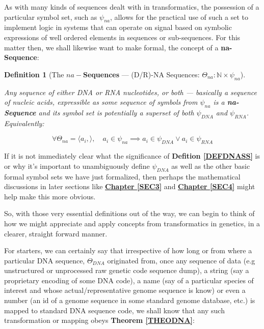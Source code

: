 \documentclass[a4paper, 18pt]{book} %
\newtheorem{defn}{Definition}
\begin{document}
As with many kinds of sequences dealt with in transformatics, the possession of a particular symbol set, such as $\psi_{na}$, allows for the practical use of such a set to implement logic in systems that can operate on signal based on symbolic expressions of well ordered elements in sequences or sub-sequences. For this matter then, we shall likewise want to make formal, the concept of a \textbf{na-Sequence}:

\begin{defn}[The \textbf{$na-$Sequences} --- (D/R)-NA Sequences: $\Theta_{na}:\mathbb{N} \times \psi_{na}$]
\label{DEFNASEQ}

Any sequence of either DNA or RNA nucleotides, or both --- basically a sequence of nucleic acids, expressible as some sequence of symbols from $\psi_{na}$ is a \textbf{na-Sequence} and its symbol set is potentially a superset of both $\psi_{DNA}$ and $\psi_{RNA}$. Equivalently:

\begin{equation}
\forall \Theta_{na} = \langle a_i, \rangle, \quad a_i \in \psi_{na} \implies a_i \in \psi_{DNA} \lor a_i \in \psi_{RNA}
\end{equation}

\end{defn}


If it is not immediately clear what the significance of \textbf{Defition \ref{DEFDNASS}} is or why it's important to unambiguously define $\psi_{DNA}$ as well as the other basic formal symbol sets we have just formalized, then perhaps the mathematical discussions in later sections like \textbf{\hyperref[SEC3]{Chapter \ref{SEC3}}} and \textbf{\hyperref[SEC4]{Chapter \ref{SEC4}}} might help make this more obvious.

So, with those very essential definitions out of the way, we can begin to think of how we might appreciate and apply concepts from transformatics in genetics, in a clearer, straight forward manner.

For starters, we can certainly say that irrespective of how long or from where a particular DNA sequence, $\Theta_{DNA}$ originated from, once any sequence of data (e.g unstructured or unprocessed raw genetic code sequence dump), a string (say a proprietary encoding of some DNA code), a name (say of a particular species of interest and whose actual/representative genome sequence is know) or even a number (an id of a genome sequence in some standard genome database, etc.) is mapped to standard DNA sequence code, we shall know that any such transformation or mapping obeys \textbf{Theorem \ref{THEODNA}}:
\end{document}
